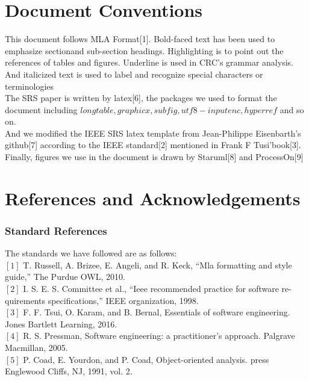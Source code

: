 \documentclass[16pt]{scrreprt}
\begin{document}
\section{Document Conventions}
This document follows MLA Format[1]. Bold-faced text has been used to emphasize sectionand sub-section headings. Highlighting is to point out the references of tables and figures. Underline is used in CRC's grammar analysis. And italicized text is used to label and recognize special characters or terminologies\\

\noindent The SRS paper is written by latex[6], the packages we used to format the document including \small{$longtable, graphicx, subfig, utf8-inputenc,hyperref$ }and so on.\\

\noindent And we modified the IEEE SRS latex template from Jean-Philippe Eisenbarth's github[7] according to the IEEE standard[2] mentioned in Frank F Tusi'book[3].\\

\noindent Finally, figures we use in the document is drawn by Staruml[8] and ProcessOn[9]

\section{References and Acknowledgements}
\subsubsection{Standard References}
The standards we have followed are as follows:\\

$[1]$ T. Russell, A. Brizee, E. Angeli, and R. Keck, “Mla formatting and style guide,” The Purdue OWL, 2010.\\

$[2]$ I. S. E. S. Committee et al., “Ieee recommended practice for software re- quirements specifications,” IEEE organization, 1998.\\


$[3]$ F. F. Tsui, O. Karam, and B. Bernal, Essentials of software engineering. Jones Bartlett Learning, 2016.\\

$[4]$ R. S. Pressman, Software engineering: a practitioner’s approach. Palgrave Macmillan, 2005.\\

$[5]$ P. Coad, E. Yourdon, and P. Coad, Object-oriented analysis. press Englewood Cliffs, NJ, 1991, vol. 2.
\end{document}
